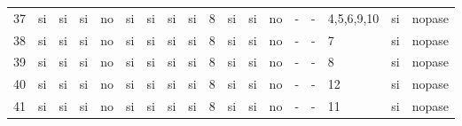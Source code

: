 \documentclass[a4paper, 10pt, notitlepage]{article}
\begin{document}
\begin{landscape}
\begin{tabularx}{1.6\textheight}{|X|X|X|X|X|X|X|X|X|X|X|X|X|X|X|X|X|X|}
37	&	si	&	si	&	si	&	no	&	si	&	si	&	si	&	si	&	8	&	si	&	si	&	no	&	-	&	-	&	4,5,6,9,10	&	si	&	nopase\\
38	&	si	&	si	&	si	&	no	&	si	&	si	&	si	&	si	&	8	&	si	&	si	&	no	&	-	&	-	&	7	&	si	&	nopase\\
39	&	si	&	si	&	si	&	no	&	si	&	si	&	si	&	si	&	8	&	si	&	si	&	no	&	-	&	-	&	8	&	si	&	nopase\\
40	&	si	&	si	&	si	&	no	&	si	&	si	&	si	&	si	&	8	&	si	&	si	&	no	&	-	&	-	&	12	&	si	&	nopase\\
41	&	si	&	si	&	si	&	no	&	si	&	si	&	si	&	si	&	8	&	si	&	si	&	no	&	-	&	-	&	11	&	si	&	nopase\\
\hline	
\end{tabularx}
\vskip3cm


\end{landscape}


	
\end{document}
